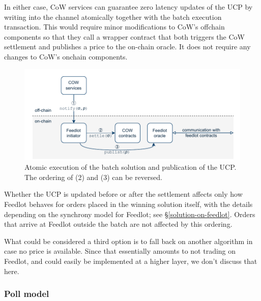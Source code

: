 \documentclass[a4paper,10pt]{article}
\theoremstyle{remark}
\begin{document}
In either case, CoW services can guarantee zero latency updates of the UCP by writing into the channel atomically together with the batch execution transaction. 
%
This would require minor modifications to CoW's offchain components so that they call a wrapper contract that both triggers the CoW settlement and publishes a price to the on-chain oracle.
%
It does not require any changes to CoW's onchain components.
%
\begin{figure}
  \begin{center}
    \vspace{2ex}
    \includegraphics[width=\textwidth * \real{0.8}]{diagrams/wrapper.pdf}
    \caption{Atomic execution of the batch solution and publication of the UCP. The ordering of (2) and (3) can be reversed.}
  \end{center}
\end{figure}
%
Whether the UCP is updated before or after the settlement affects only how Feedlot behaves for orders placed in the winning solution itself, with the details depending on the synchrony model for Feedlot; see \S\ref{solution-on-feedlot}.
%
Orders that arrive at Feedlot outside the batch are not affected by this ordering.

What could be considered a third option is to fall back on another algorithm in case no price is available. 
%
Since that essentially amounts to not trading on Feedlot, and could easily be implemented at a higher layer, we don't discuss that here.

\subsubsection{Poll model}
\end{document}
